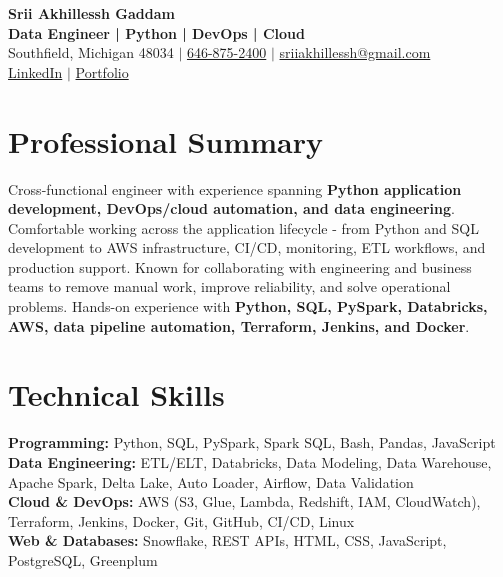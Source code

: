 \documentclass[letterpaper,10pt]{article}
\begin{document}
\fontsize{9.35pt}{10.45pt}\selectfont

\begin{center}
    {\LARGE \textbf{Srii Akhillessh Gaddam}} \\[-1pt]
    \textbf{Data Engineer | Python | DevOps | Cloud} \\[2pt]
    Southfield, Michigan 48034 $|$
    \href{tel:6468752400}{646-875-2400} $|$
    \href{mailto:sriiakhillessh@gmail.com}{sriiakhillessh@gmail.com} \\[1pt]
    \href{https://www.linkedin.com/in/srii-akhiilessh-gaddam-b48668191/}{LinkedIn} $|$
    \href{https://sriiakhillesshg.github.io/portfolio/}{Portfolio}
\end{center}
\vspace{-8pt}

\section{Professional Summary}
\small{Cross-functional engineer with experience spanning \textbf{Python application development, DevOps/cloud automation, and data engineering}. Comfortable working across the application lifecycle - from Python and SQL development to AWS infrastructure, CI/CD, monitoring, ETL workflows, and production support. Known for collaborating with engineering and business teams to remove manual work, improve reliability, and solve operational problems. Hands-on experience with \textbf{Python, SQL, PySpark, Databricks, AWS, data pipeline automation, Terraform, Jenkins, and Docker}.}

\section{Technical Skills}
\small{
\textbf{Programming:} Python, SQL, PySpark, Spark SQL, Bash, Pandas, JavaScript \\
\textbf{Data Engineering:} ETL/ELT, Databricks, Data Modeling, Data Warehouse, Apache Spark, Delta Lake, Auto Loader, Airflow, Data Validation \\
\textbf{Cloud \& DevOps:} AWS (S3, Glue, Lambda, Redshift, IAM, CloudWatch), Terraform, Jenkins, Docker, Git, GitHub, CI/CD, Linux \\
\textbf{Web \& Databases:} Snowflake, REST APIs, HTML, CSS, JavaScript, PostgreSQL, Greenplum
}
\end{document}
